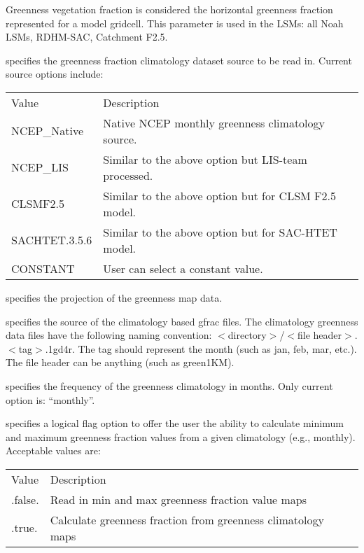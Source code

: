  Greenness vegetation fraction is considered the horizontal greenness
 fraction represented for a model gridcell. This parameter is used in the
 LSMs: all Noah LSMs, RDHM-SAC, Catchment F2.5. 

  specifies the greenness fraction
 climatology dataset source to be read in. Current source options include:

 \begin{tabular}{ll}
 Value         & Description    \\
 NCEP\_Native  &  Native NCEP monthly greenness climatology source. \\
 NCEP\_LIS     &  Similar to the above option but LIS-team processed. \\
 CLSMF2.5      &  Similar to the above option but for CLSM F2.5 model. \\
 SACHTET.3.5.6 &  Similar to the above option but for SAC-HTET model. \\
 CONSTANT      &  User can select a constant value. \\
 \end{tabular}

  specifies the projection of the
 greenness map data.

  specifies the source of the
 climatology based gfrac files.  The climatology greenness data
 files have the following naming convention:
 $<$directory$>$/$<$file header$>$.$<$tag$>$.1gd4r.
 The tag should represent the month (such as jan, feb, mar, etc.).
 The file header can be anything (such as green1KM).

  specifies the frequency of
 the greenness climatology in months.
 Only current option is: ``monthly''.

  specifies a
 logical flag option to offer the user the ability to calculate
 minimum and maximum greenness fraction values from a given
 climatology (e.g., monthly).
 Acceptable values are:

 \begin{tabular}{ll}
 Value     & Description                 \\
 .false.   & Read in min and max greenness fraction value maps     \\
 .true.    & Calculate greenness fraction from greenness climatology maps \\
 \end{tabular}

